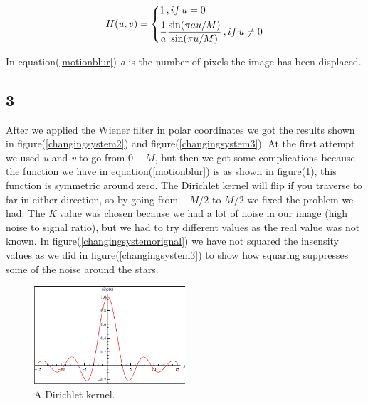 {\begin{equation}
    H(u,v) =     \begin{dcases}
        1\, , if \,u = 0\\
        \frac{1}{a}\frac{\sin(\pi a u/M)}{\sin(\pi u /M)}\, , if \, u \neq 0\\
    \end{dcases}
    \label{motionblur}
\end{equation}

In equation(\ref{motionblur}) \emph{a} is the number of pixels the image has been displaced. 


\subsection{3}


After we applied the Wiener filter in polar coordinates we got the results shown in figure(\ref{changingsystem2}) and figure(\ref{changingsystem3}). At the first attempt we used \emph{u} and \emph{v} to go from $0-M$, but then we got some complications because the function we have in equation(\ref{motionblur}) is as shown in figure(\ref{sincc}), this function is symmetric around zero. The Dirichlet kernel will flip if you traverse to far in either direction, so by going from $-M/2$ to $M/2$ we fixed the problem we had. The \emph{K} value was chosen because we had a lot of noise in our image (high noise to signal ratio), but we had to try different values as the real value was not known. In figure(\ref{changingsystemorignal}) we have not squared the insensity values as we did in figure(\ref{changingsystem3}) to show how squaring suppresses some of the noise around the stars.


\begin{figure}[H]
    {\centering
        \includegraphics[width=0.5\textwidth]{sinc.png}
        \caption{A Dirichlet kernel.}
        \label{sincc}
    \par}
    \end{figure}

}
